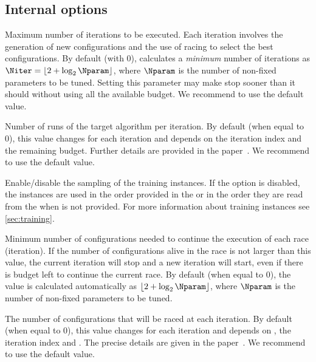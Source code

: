 \subsection[Internal irace options]{Internal \irace options}
\begin{description}
Maximum number of iterations to be executed. Each iteration involves the generation of new configurations and the use of racing to select the best configurations. By default (with 0), \irace calculates a \emph{minimum} number of iterations as $\Niter = \lfloor 2 + \log_{2}\Nparam \rfloor$, where $\Nparam$ is the number of non-fixed parameters to be tuned. Setting this parameter may make \irace stop sooner than it should without using all the available budget. We recommend to use the default value.

Number of runs of the target algorithm per iteration. By default (when equal to 0), this value changes for each iteration and depends on the iteration index and the remaining budget. Further details are provided in the \irace paper~\citep{LopDubPerStuBir2016irace}.
We recommend to use the default value.

Enable/disable the sampling of the training instances. If the option  is disabled, the instances are used in the order provided in the  or in the order they are read from the  when is not provided. For more information about training instances see \autoref{sec:training}.

Minimum number of configurations needed to continue the execution of each race (iteration). If the number of configurations alive in the race is not larger than this value, the current iteration will stop and a new iteration will start, even if there is budget left to continue the current race. By default (when equal to 0), the value is calculated automatically as $\lfloor 2 + \log_{2}\Nparam \rfloor$, where $\Nparam$ is the number of non-fixed parameters to be tuned.

  The number of configurations that will be raced at each iteration. By default (when equal to 0), this value changes for each iteration and depends on , the iteration index and . The precise details are given in the \irace paper~\citep{LopDubPerStuBir2016irace}.
We recommend to use the default value.


\end{description}
